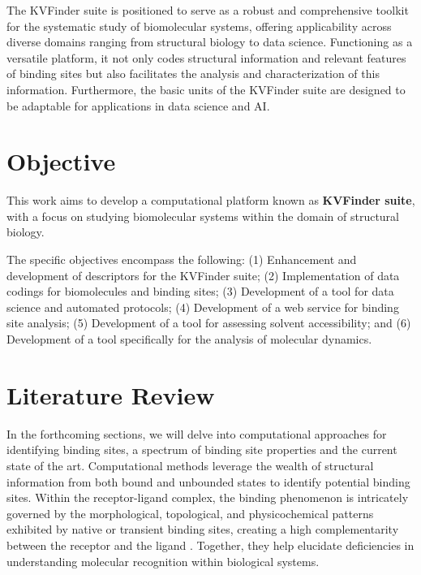 \documentclass[Ingles]{phdthesis}
\begin{document}
The KVFinder suite is positioned to serve as a robust and comprehensive toolkit for the systematic study of biomolecular systems, offering applicability across diverse domains ranging from structural biology to data science. Functioning as a versatile platform, it not only codes structural information and relevant features of binding sites but also facilitates the analysis and characterization of this information. Furthermore, the basic units of the KVFinder suite are designed to be adaptable for applications in data science and AI.


\chapter{Objective}

This work aims to develop a computational platform known as \textbf{KVFinder suite}, with a focus on studying biomolecular systems within the domain of structural biology.

The specific objectives encompass the following: (1) Enhancement and development of descriptors for the KVFinder suite; (2) Implementation of data codings for biomolecules and binding sites; (3) Development of a tool for data science and automated protocols; (4) Development of a web service for binding site analysis; (5) Development of a tool for assessing solvent accessibility; and (6) Development of a tool specifically for the analysis of molecular dynamics.


\chapter{Literature Review}

In the forthcoming sections, we will delve into computational approaches for identifying binding sites, a spectrum of binding site properties and the current state of the art. Computational methods leverage the wealth of structural information from both bound and unbounded states to identify potential binding sites. Within the receptor-ligand complex, the binding phenomenon is intricately governed by the morphological, topological, and physicochemical patterns exhibited by native or transient binding sites, creating a high complementarity between the receptor and the ligand \cite{holyoak2013,sotriffer2002,henrich2010,guerra2019}. Together, they help elucidate deficiencies in understanding molecular recognition within biological systems.
\end{document}
